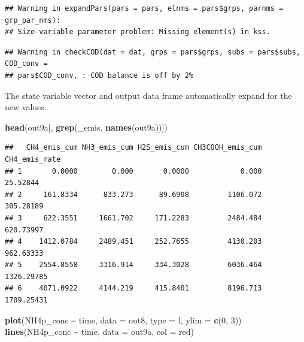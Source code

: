 \documentclass[
]{article}
\newenvironment{Shaded}{\begin{snugshade}}{\end{snugshade}}
\newcommand{\AttributeTok}[1]{\textcolor[rgb]{0.13,0.29,0.53}{#1}}
\newcommand{\DecValTok}[1]{\textcolor[rgb]{0.00,0.00,0.81}{#1}}
\newcommand{\FunctionTok}[1]{\textcolor[rgb]{0.13,0.29,0.53}{\textbf{#1}}}
\newcommand{\NormalTok}[1]{#1}
\newcommand{\SpecialCharTok}[1]{\textcolor[rgb]{0.81,0.36,0.00}{\textbf{#1}}}
\newcommand{\StringTok}[1]{\textcolor[rgb]{0.31,0.60,0.02}{#1}}
\begin{document}
\begin{verbatim}
## Warning in expandPars(pars = pars, elnms = pars$grps, parnms = grp_par_nms):
## Size-variable parameter problem: Missing element(s) in kss.
\end{verbatim}

\begin{verbatim}
## Warning in checkCOD(dat = dat, grps = pars$grps, subs = pars$subs, COD_conv =
## pars$COD_conv, : COD balance is off by 2%
\end{verbatim}

The state variable vector and output data frame automatically expand for
the new values.

\begin{Shaded}
\begin{Highlighting}[]
\FunctionTok{head}\NormalTok{(out9a[, }\FunctionTok{grep}\NormalTok{(}\StringTok{\textquotesingle{}\_emis\textquotesingle{}}\NormalTok{, }\FunctionTok{names}\NormalTok{(out9a))])}
\end{Highlighting}
\end{Shaded}

\begin{verbatim}
##   CH4_emis_cum NH3_emis_cum H2S_emis_cum CH3COOH_emis_cum CH4_emis_rate
## 1       0.0000        0.000       0.0000            0.000      25.52844
## 2     161.8334      833.273      89.6908         1106.072     305.28189
## 3     622.3551     1661.702     171.2283         2484.484     620.73997
## 4    1412.0784     2489.451     252.7655         4130.203     962.63333
## 5    2554.8558     3316.914     334.3028         6036.464    1326.29785
## 6    4071.0922     4144.219     415.8401         8196.713    1709.25431
\end{verbatim}

\begin{Shaded}
\begin{Highlighting}[]
\FunctionTok{plot}\NormalTok{(NH4p\_conc }\SpecialCharTok{\textasciitilde{}}\NormalTok{ time, }\AttributeTok{data =}\NormalTok{ out8, }\AttributeTok{type =} \StringTok{\textquotesingle{}l\textquotesingle{}}\NormalTok{, }\AttributeTok{ylim =} \FunctionTok{c}\NormalTok{(}\DecValTok{0}\NormalTok{, }\DecValTok{3}\NormalTok{))}
\FunctionTok{lines}\NormalTok{(NH4p\_conc }\SpecialCharTok{\textasciitilde{}}\NormalTok{ time, }\AttributeTok{data =}\NormalTok{ out9a, }\AttributeTok{col =} \StringTok{\textquotesingle{}red\textquotesingle{}}\NormalTok{)}
\end{Highlighting}
\end{Shaded}
\end{document}
